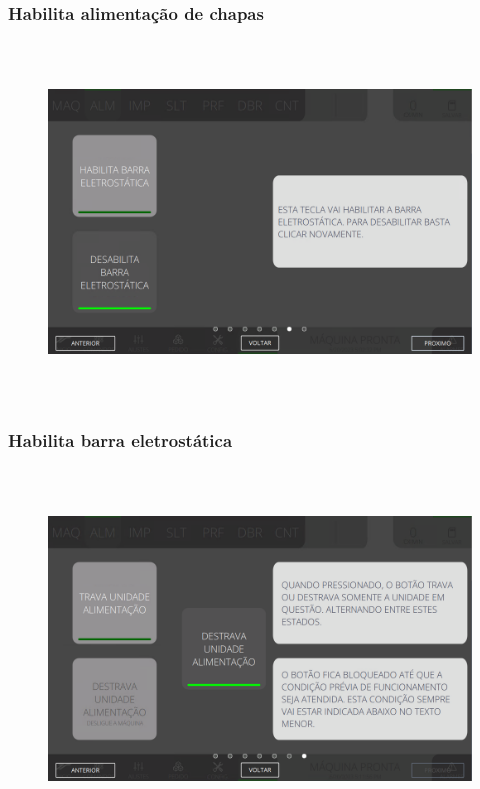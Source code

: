 \newpage
\thispagestyle{fancy}
\vspace*{40 pt}
\subsubsection{\small{Habilita alimentação de chapas}}\label{miniTelaComandoAlimentacaoHabilitaAlimentacaoDeChapas}
\vspace*{\fill}
\begin{figure}[h]
  \centering
  \includegraphics[width=576px,height=360px]{src/imagesMiniline/03-Feeder/commands/e5.png}
\end{figure}
\vspace*{\fill}

\newpage
\thispagestyle{fancy}
\vspace*{40 pt}
\subsubsection{\small{Habilita barra eletrostática}}\label{miniTelaComandoAlimentacaoHabilitaBarraEletrostatica}
\vspace*{\fill}
\begin{figure}[h]
  \centering
  \includegraphics[width=576px,height=360px]{src/imagesMiniline/03-Feeder/commands/e6.png}
\end{figure}
\vspace*{\fill}

